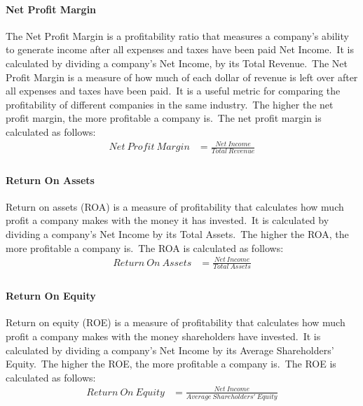 \documentclass[../xlapes02]{subfiles}
\begin{document}
    \paragraph{Net Profit Margin}\label{par:net-profit-margin}
    The Net Profit Margin is a profitability ratio that measures a company's ability to generate income after all expenses and taxes have been paid Net Income.\ It is calculated by dividing a company's Net Income, by its Total Revenue.\ The Net Profit Margin is a measure of how much of each dollar of revenue is left over after all expenses and taxes have been paid.\ It is a useful metric for comparing the profitability of different companies in the same industry.\ The higher the net profit margin, the more profitable a company is.\ The net profit margin is calculated as follows:
    \begin{equation}
        \label{eq:net-profit-margin}
        \begin{split}
            Net\ Profit\ Margin&=\frac{Net\ Income}{Total\ Revenue}\\
        \end{split}
    \end{equation}

    \paragraph{Return On Assets}\label{par:return-on-assets}
    Return on assets (ROA) is a measure of profitability that calculates how much profit a company makes with the money it has invested.\ It is calculated by dividing a company's Net Income by its Total Assets.\ The higher the ROA, the more profitable a company is.\ The ROA is calculated as follows:
    \begin{equation}
        \label{eq:return-on-assets}
        \begin{split}
            Return\ On\ Assets&=\frac{Net\ Income}{Total\ Assets}\\
        \end{split}
    \end{equation}

    \paragraph{Return On Equity}\label{par:return-on-equity}
    Return on equity (ROE) is a measure of profitability that calculates how much profit a company makes with the money shareholders have invested.\ It is calculated by dividing a company's Net Income by its Average Shareholders' Equity.\ The higher the ROE, the more profitable a company is.\ The ROE is calculated as follows:
    \begin{equation}
        \label{eq:return-on-equity}
        \begin{split}
            Return\ On\ Equity&=\frac{Net\ Income}{Average\ Shareholders'\ Equity}\\
        \end{split}
    \end{equation}
\end{document}
